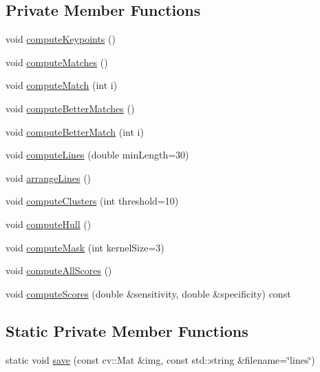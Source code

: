 \subsection*{Private Member Functions}
\begin{DoxyCompactItemize}
\item 
void \hyperlink{classdefals_1_1copy_move_detector_ac9025dec1bdc571c914fe704a8dac252}{compute\+Keypoints} ()
\item 
void \hyperlink{classdefals_1_1copy_move_detector_ad92c77ad47c3af47b8d2383a7a6b2753}{compute\+Matches} ()
\item 
void \hyperlink{classdefals_1_1copy_move_detector_a43c24f4f6cf44f291da75733d2441ffe}{compute\+Match} (int i)
\item 
void \hyperlink{classdefals_1_1copy_move_detector_ada9b809bd69be7dc9a6535b1c07967b7}{compute\+Better\+Matches} ()
\item 
void \hyperlink{classdefals_1_1copy_move_detector_ab506d8bea186d8b17e0c46b8dc94be4b}{compute\+Better\+Match} (int i)
\item 
void \hyperlink{classdefals_1_1copy_move_detector_a72a06ac231780effab58c27dfff57940}{compute\+Lines} (double min\+Length=30)
\item 
void \hyperlink{classdefals_1_1copy_move_detector_a49c2c1503a2dd4ec039c2407c4da2afe}{arrange\+Lines} ()
\item 
void \hyperlink{classdefals_1_1copy_move_detector_a34d3aafc7e8cfacab0a1f2aa0d45d655}{compute\+Clusters} (int threshold=10)
\item 
void \hyperlink{classdefals_1_1copy_move_detector_a3878ac6d8549f3f18ddc02439504b3a0}{compute\+Hull} ()
\item 
void \hyperlink{classdefals_1_1copy_move_detector_a2ba4bcb4cd0f752c84ceb411052d1117}{compute\+Mask} (int kernel\+Size=3)
\item 
void \hyperlink{classdefals_1_1copy_move_detector_a13205daa0d2bf548f1c284ab7656efff}{compute\+All\+Scores} ()
\item 
void \hyperlink{classdefals_1_1copy_move_detector_a4eba5b33edb3a8aef5e19f769a17a3d8}{compute\+Scores} (double \&sensitivity, double \&specificity) const
\end{DoxyCompactItemize}
\subsection*{Static Private Member Functions}
\begin{DoxyCompactItemize}
\item 
static void \hyperlink{classdefals_1_1copy_move_detector_aa77b7daa6a859f58a09462d12d1a63ed}{save} (const cv\+::\+Mat \&img, const std\+::string \&filename=\char`\"{}lines\char`\"{})
\end{DoxyCompactItemize}
